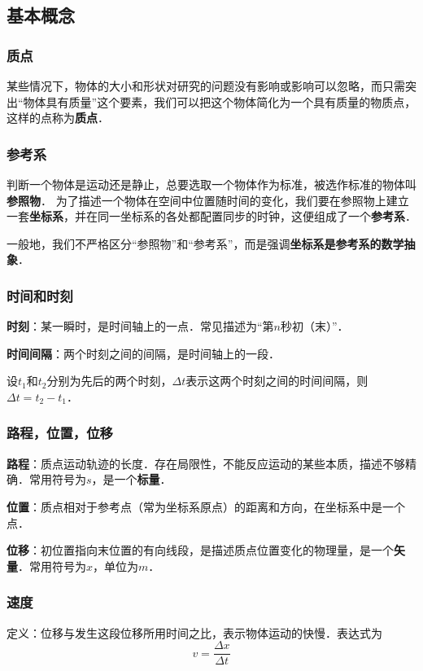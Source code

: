 

\subsection{基本概念}
\subsubsection{质点}
某些情况下，物体的大小和形状对研究的问题没有影响或影响可以忽略，而只需突出“物体具有质量”这个要素，我们可以把这个物体简化为一个具有质量的物质点，这样的点称为\textbf{质点}．

\subsubsection{参考系}
判断一个物体是运动还是静止，总要选取一个物体作为标准，被选作标准的物体叫\textbf{参照物}．
为了描述一个物体在空间中位置随时间的变化，我们要在参照物上建立一套\textbf{坐标系}，并在同一坐标系的各处都配置同步的时钟，这便组成了一个\textbf{参考系}．

一般地，我们不严格区分“参照物”和“参考系”，而是强调\textbf{坐标系是参考系的数学抽象}．

\subsubsection{时间和时刻}
\textbf{时刻}：某一瞬时，是时间轴上的一点．常见描述为“第$n$秒初（末）”．

\textbf{时间间隔}：两个时刻之间的间隔，是时间轴上的一段．

设$t_1$和$t_2$分别为先后的两个时刻，$\Delta t$表示这两个时刻之间的时间间隔，则$\Delta t = t_2 - t_1$．

\subsubsection{路程，位置，位移}
\textbf{路程}：质点运动轨迹的长度．存在局限性，不能反应运动的某些本质，描述不够精确．常用符号为$s$，是一个\textbf{标量}．

\textbf{位置}：质点相对于参考点（常为坐标系原点）的距离和方向，在坐标系中是一个点．

\textbf{位移}：初位置指向末位置的有向线段，是描述质点位置变化的物理量，是一个\textbf{矢量}．常用符号为$x$，单位为$m$．

\subsubsection{速度}
定义：位移与发生这段位移所用时间之比，表示物体运动的快慢．表达式为
\begin{equation}\label{HSPM01_eq3}
v=\frac{\Delta x}{\Delta t}
\end{equation}

